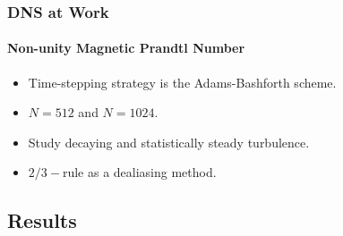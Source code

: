 \documentclass{beamer}
\begin{document}
\begin{frame}
 \frametitle{DNS at Work}
 \framesubtitle{Non-unity Magnetic Prandtl Number}
 
 \begin{itemize}
  \item Time-stepping strategy is the Adams-Bashforth scheme. %
  \item<2-> $N = 512$ and $N = 1024$.
  \item<3-> Study decaying and statistically steady turbulence. 
  \item<4-> $2/3-$rule as a dealiasing method. 
 \end{itemize}

 
 
 
\end{frame}

\subsection{Results}

 
 
 
\end{document}
